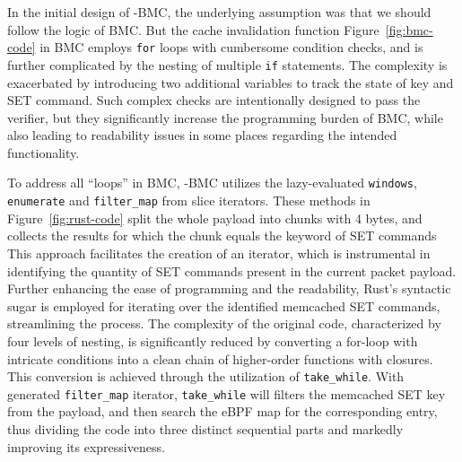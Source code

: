 In the initial design of \projname{}-BMC, the underlying assumption was that
    we should follow the logic of BMC.
But the cache invalidation function Figure~\ref{fig:bmc-code} in BMC employs
    \texttt{for} loops with cumbersome condition checks, and is further
    complicated by the nesting of multiple \texttt{if} statements.
The complexity is exacerbated by introducing two additional variables to track
    the state of key and SET command.
Such complex checks are intentionally designed to pass the
    verifier, but they significantly increase the programming burden
    of BMC, while also leading to readability issues in some places regarding
    the intended functionality.


To address all ``loops'' in BMC, \projname{}-BMC utilizes the lazy-evaluated
    \texttt{windows}, \texttt{enumerate} and \texttt{filter\_map} from slice iterators.
These methods in Figure~\ref{fig:rust-code} split the whole payload into chunks
    with 4 bytes, and collects the results for which the chunk equals the keyword
    of SET commands
This approach facilitates the creation of an iterator, which is instrumental in identifying
    the quantity of SET commands present in the current packet payload.
Further enhancing the ease of programming and the readability, Rust's syntactic sugar is employed for
    iterating over the identified memcached SET commands, streamlining the process.
The complexity of the original code, characterized by four levels of nesting,
    is significantly reduced by converting a for-loop with intricate conditions
    into a clean chain of higher-order functions with closures.
This conversion is achieved through the utilization of \texttt{take\_while}.
    With generated \texttt{filter\_map} iterator, \texttt{take\_while} will
    filters the memcached SET key from the payload, and then search the eBPF map for
    the corresponding entry, thus dividing the code into three distinct
    sequential parts and markedly improving its expressiveness.

